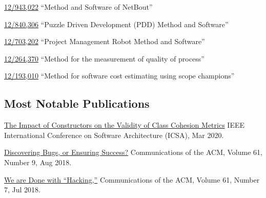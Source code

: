 \documentclass{yb}
\renewcommand\emph[1]{#1}
\begin{document}
\href{https://patents.google.com/patent/US20120117164}{12/943,022}
``Method and Software of NetBout''

\href{https://patents.google.com/patent/US20120023476}{12/840,306}
``Puzzle Driven Development (PDD) Method and Software''

\href{https://patents.google.com/patent/US20110196798}{12/703,202}
``Project Management Robot Method and Software''

\href{https://patents.google.com/patent/US20100114638}{12/264,370}
``Method for the measurement of quality of process''

\href{https://patents.google.com/patent/US20100042968}{12/193,010}
``Method for software cost estimating using scope champions''

\subsection*{Most Notable Publications}

\begin{samepage}
\emph{\href{https://www.yegor256.com/pdf/2020/icsa20.pdf}{The Impact of Constructors on the Validity of Class Cohesion Metrics}}\newline
IEEE International Conference on Software Architecture (ICSA), Mar 2020.
\end{samepage}

\begin{samepage}
\emph{\href{https://www.yegor256.com/pdf/2018/discovering-bugs.pdf}{Discovering Bugs, or Ensuring Success?}}\newline
Communications of the ACM, Volume 61, Number 9, Aug 2018.
\end{samepage}

\begin{samepage}
\emph{\href{https://www.yegor256.com/pdf/2018/we-are-done-with-hacking.pdf}{We are Done with ``Hacking,''}}\newline
Communications of the ACM, Volume 61, Number 7, Jul 2018.
\end{samepage}


\end{document}
